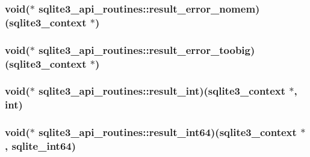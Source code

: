 \hypertarget{structsqlite3__api__routines_abaccd85342d77c068d05de2b9cd9c7e0}{
\subsubsection[{result\-\_\-error\-\_\-nomem}]{\setlength{\rightskip}{0pt plus 5cm}void($\ast$ sqlite3\-\_\-api\-\_\-routines\-::result\-\_\-error\-\_\-nomem)({\bf sqlite3\-\_\-context} $\ast$)}}\label{structsqlite3__api__routines_abaccd85342d77c068d05de2b9cd9c7e0}
\hypertarget{structsqlite3__api__routines_acc888c07a82710c1f0c791ba3058c44c}{
\subsubsection[{result\-\_\-error\-\_\-toobig}]{\setlength{\rightskip}{0pt plus 5cm}void($\ast$ sqlite3\-\_\-api\-\_\-routines\-::result\-\_\-error\-\_\-toobig)({\bf sqlite3\-\_\-context} $\ast$)}}\label{structsqlite3__api__routines_acc888c07a82710c1f0c791ba3058c44c}
\hypertarget{structsqlite3__api__routines_aca3c3c95e95664898bf88da2e509e5af}{
\subsubsection[{result\-\_\-int}]{\setlength{\rightskip}{0pt plus 5cm}void($\ast$ sqlite3\-\_\-api\-\_\-routines\-::result\-\_\-int)({\bf sqlite3\-\_\-context} $\ast$, int)}}\label{structsqlite3__api__routines_aca3c3c95e95664898bf88da2e509e5af}
\hypertarget{structsqlite3__api__routines_a92556e67d3485c59031e3d3acf401501}{
\subsubsection[{result\-\_\-int64}]{\setlength{\rightskip}{0pt plus 5cm}void($\ast$ sqlite3\-\_\-api\-\_\-routines\-::result\-\_\-int64)({\bf sqlite3\-\_\-context} $\ast$, {\bf sqlite\-\_\-int64})}}\label{structsqlite3__api__routines_a92556e67d3485c59031e3d3acf401501}
